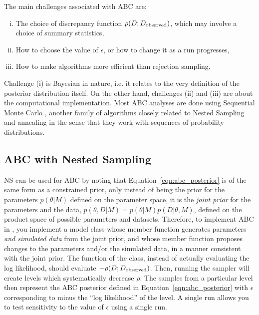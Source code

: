 \documentclass[article]{jss}
\begin{document}
The main challenges associated with ABC are:
\begin{enumerate}[(i)]
\item The choice of discrepancy function $\rho(D; D_{\rm observed})$, which
may involve a choice of summary statistics,
\item How to choose the value of $\epsilon$, or how to change it as a run
progresses,
\item How to make algorithms more efficient than rejection sampling.
\end{enumerate}
Challenge (i) is Bayesian in nature, i.e. it relates to the very
definition of the posterior distribution itself.
On the other hand, challenges (ii) and (iii) are about the computational
implementation. Most ABC analyses are done using Sequential Monte Carlo
\citep[SMC; ][]{delmoral}, another family of algorithms closely related
to Nested Sampling and annealing in the sense that they work with
sequences of probability distributions.

\subsection{ABC with Nested Sampling}
NS can be used for ABC by noting that Equation~\ref{eqn:abc_posterior}
is of the same form as a constrained prior, only instead of being the prior
for the parameters $p(\theta | M)$ defined on the parameter space, it is
the {\em joint prior} for the parameters and the data,
$p(\theta, D |M) = p(\theta | M)p(D | \theta, M)$, defined on the product
space of possible parameters and datasets. Therefore, to implement
ABC in , you implement a model class
whose  member function generates parameters {\em and simulated
data} from the joint prior, and whose  member function
proposes changes to the parameters and/or the simulated data, in a
manner consistent with the joint prior. The  function
of the class, instead of actually evaluating the log likelihood, should
evaluate $-\rho(D; D_{\rm observed})$. Then, running the sampler
will create levels which systematically decrease $\rho$. The samples from
a particular level then represent the ABC posterior defined in
Equation~\ref{eqn:abc_posterior} with $\epsilon$ corresponding to minus
the ``log likelihood'' of the level.
A single  run allows you to test sensitivity
to the value of $\epsilon$ using a single run.
\end{document}
